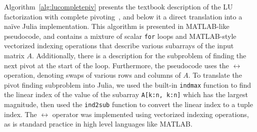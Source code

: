 Algorithm~\ref{alg:lucompletepiv} presents the textbook description of the LU
factorization with complete pivoting~\cite[Algorithm 3.4.3 (Outer Product LU
with Complete Pivoting), p. 132]{Golub2013}, and below it a direct translation
into a na\"ive Julia implementation. This algorithm is presented in MATLAB-like
pseudocode, and contains a mixture of scalar \lstinline|for| loops and
MATLAB-style vectorized indexing operations that describe various subarrays of
the input matrix $A$. Additionally, there is a description for the subproblem
of finding the next pivot at the start of the loop. Furthermore, the pseudocode
uses the $\leftrightarrow$ operation, denoting swaps of various rows and
columns of $A$. To translate the pivot finding subproblem into Julia, we used
the built-in \lstinline|indmax| function to find the linear index of the value
of the subarray \lstinline|A[k:n, k:n]| which has the largest magnitude, then
used the \lstinline|ind2sub| function to convert the linear index to a tuple
index. The $\leftrightarrow$ operator was implemented using vectorized indexing
operations, as is standard practice in high level languages like MATLAB.



